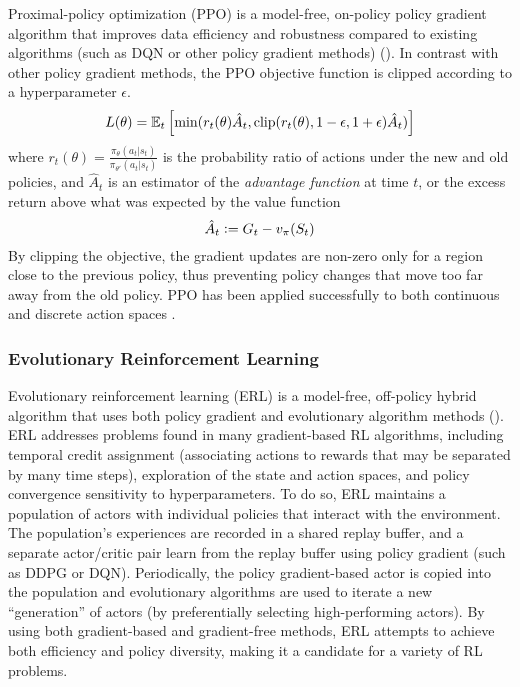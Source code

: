 Proximal-policy optimization (PPO) is a model-free, on-policy policy gradient algorithm that improves data efficiency and robustness compared to existing algorithms (such as DQN or other policy gradient methods)
(\cite{schulman2017proximal}).
In contrast with other policy gradient methods, the PPO objective function is clipped according to a hyperparameter $\epsilon$.
\begin{equation}\label{eq:ppo_loss}
    L(\theta) = \mathbb E_t \left[\min(
        r_t(\theta)\hat{A}_t,
        \text{clip}(r_t(\theta), 1-\epsilon, 1+\epsilon) \hat{A}_t
    )\right]
\end{equation}
where
$r_t(\theta) = \frac{\pi_\theta(a_t|s_t)}{\pi_{\theta'}(a_t|s_t)}$ is the probability ratio of actions under the new and old policies, and $\hat{A}_t$ is an estimator of the \emph{advantage function} at time $t$, or the excess return above what was expected by the value function
\begin{equation}
    \hat{A}_t \mathrel{\mathop:}= G_t - v_\pi(S_t)
\end{equation}
By clipping the objective, the gradient updates are non-zero only for a region close to the previous policy, thus preventing policy changes that move too far away from the old policy.
PPO has been applied successfully to both continuous and discrete action spaces%
.

\subsubsection{Evolutionary Reinforcement Learning}

Evolutionary reinforcement learning (ERL) is a model-free, off-policy hybrid algorithm that uses both policy gradient and evolutionary algorithm methods (\cite{khadka2018evolutionguided}). ERL addresses problems found in many  gradient-based RL algorithms, including temporal credit assignment (associating actions to rewards that may be separated by many time steps), exploration of the state and action spaces, and policy convergence sensitivity to hyperparameters. To do so, ERL maintains a population of actors with individual policies that interact with the environment. The population's experiences are recorded in a shared replay buffer, and a separate actor/critic pair learn from the replay buffer using policy gradient (such as DDPG or DQN). Periodically, the policy gradient-based actor is copied into the population and evolutionary algorithms are used to iterate a new ``generation'' of actors (by preferentially selecting high-performing actors). By using both gradient-based and gradient-free methods, ERL attempts to achieve both efficiency and policy diversity, making it a candidate for a variety of RL problems.

